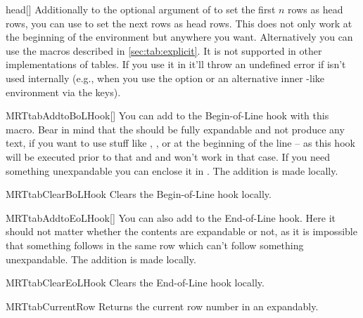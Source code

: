 \begin{describemacro}{head}[]%
  Additionally to the optional argument of  to set the first $n$
  rows as head rows, you can use  to set the next  rows as
  head rows. This does not only work at the beginning of the environment but
  anywhere you want. Alternatively you can use the macros described in
  \autoref{sec:tab:explicit}. It is not supported in other implementations of
  tables. If you use it in  it'll throw an undefined error if
   isn't used internally (e.g., when you use the
   option or an alternative inner -like environment via
  the  keys).
\end{describemacro}%

\begin{describemacro}{MRTtabAddtoBoLHook}[]%
  You can add  to the Begin-of-Line hook with this macro. Bear in
  mind that the  should be fully expandable and not produce any
  text, if you want to use stuff like , , or
   at the beginning of the line -- as this hook will be executed prior
  to that and  and  won't work in that case. If you need
  something unexpandable you can enclose it in . The addition is
  made locally.
\end{describemacro}%

\begin{describemacro}{MRTtabClearBoLHook}%
  Clears the Begin-of-Line hook locally.
\end{describemacro}%

\begin{describemacro}{MRTtabAddtoEoLHook}[]%
  You can also add  to the End-of-Line hook. Here it should not
  matter whether the contents are expandable or not, as it is impossible that
  something follows in the same row which can't follow something unexpandable.
  The addition is made locally.
\end{describemacro}%

\begin{describemacro}{MRTtabClearEoLHook}%
  Clears the End-of-Line hook locally.
\end{describemacro}%

\begin{describemacro}{MRTtabCurrentRow}%
  Returns the current row number in an  expandably.
\end{describemacro}%

